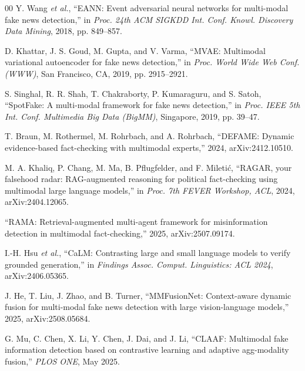 \documentclass[conference,a4paper]{IEEEtran}
\newif\ifdraftnotes
\begin{document}
\begin{thebibliography}{00}
 Y. Wang \emph{et al.}, ``EANN: Event adversarial neural
networks for multi-modal fake news detection,'' in \emph{Proc. 24th ACM
SIGKDD Int. Conf. Knowl. Discovery Data Mining}, 2018, pp. 849--857.

 D. Khattar, J. S. Goud, M. Gupta, and V. Varma,
``MVAE: Multimodal variational autoencoder for fake news detection,'' in
\emph{Proc. World Wide Web Conf. (WWW)}, San Francisco, CA, 2019,
pp. 2915--2921.

 S. Singhal, R. R. Shah, T. Chakraborty, P. Kumaraguru, and
S. Satoh, ``SpotFake: A multi-modal framework for fake news detection,'' in
\emph{Proc. IEEE 5th Int. Conf. Multimedia Big Data (BigMM)}, Singapore, 2019,
pp. 39--47.

 T. Braun, M. Rothermel, M. Rohrbach, and A. Rohrbach,
``DEFAME: Dynamic evidence-based fact-checking with multimodal experts,''
2024, arXiv:2412.10510.

 M. A. Khaliq, P. Chang, M. Ma, B. Pflugfelder, and
F. Mileti\'{c}, ``RAGAR, your falsehood radar: RAG-augmented reasoning for
political fact-checking using multimodal large language models,'' in
\emph{Proc. 7th FEVER Workshop, ACL}, 2024, arXiv:2404.12065.

 ``RAMA: Retrieval-augmented multi-agent framework for
misinformation detection in multimodal fact-checking,'' 2025,
arXiv:2507.09174.
\ifdraftnotes\\\emph{\footnotesize [DRAFT NOTE -- REMOVE BEFORE SUBMISSION]
Author list not independently confirmed at time of writing; verify against the
arXiv record before submission.}\fi

 I.-H. Hsu \emph{et al.}, ``CaLM: Contrasting large and small
language models to verify grounded generation,'' in \emph{Findings Assoc.
Comput. Linguistics: ACL 2024}, arXiv:2406.05365.

 J. He, T. Liu, J. Zhao, and B. Turner,
``MMFusionNet: Context-aware dynamic fusion for multi-modal fake news
detection with large vision-language models,'' 2025, arXiv:2508.05684.

 G. Mu, C. Chen, X. Li, Y. Chen, J. Dai, and J. Li,
``CLAAF: Multimodal fake information detection based on contrastive learning
and adaptive agg-modality fusion,'' \emph{PLOS ONE}, May 2025.


\end{thebibliography}
\end{document}
